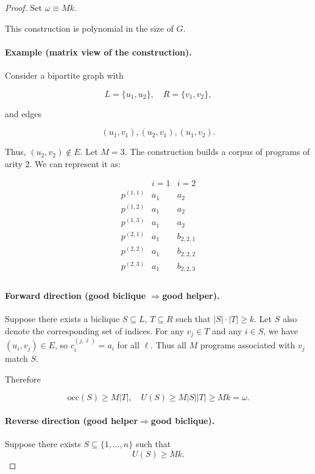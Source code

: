\begin{proof}
Set $\omega \equiv Mk$.

This construction is polynomial in the size of $G$.

\par\noindent
\paragraph{Example (matrix view of the construction).} Consider a bipartite graph with 

\[ 
L = \{u_1, u_2\}, \quad R = \{v_1, v_2\}, 
\] 

and edges 

\[ 
(u_1,v_1), (u_2,v_1), (u_1,v_2). 
\]

Thus, $(u_2, v_2) \notin E$. Let $M = 3$. The construction builds a corpus of programs of arity $2$. We can represent it as: 

\[ 
\begin{array}{c|cc} & i=1 & i=2 \\ \hline p^{(1,1)} & a_1 & a_2 \\ p^{(1,2)} & a_1 & a_2 \\ p^{(1,3)} & a_1 & a_2 \\ \hline p^{(2,1)} & a_1 & b_{2,2,1} \\ p^{(2,2)} & a_1 & b_{2,2,2} \\ p^{(2,3)} & a_1 & b_{2,2,3} \\ \end{array} 
\]

\par\noindent
\paragraph{Forward direction (good biclique $\Rightarrow$good helper).}
Suppose there exists a biclique $S \subseteq L$, $T \subseteq R$
such that $|S|\cdot|T| \ge k$.
Let $S$ also denote the corresponding set of indices. For any $v_j \in T$ and any $i \in S$, we have $(u_i,v_j)\in E$,
so $c_i^{(j,\ell)} = a_i$ for all $\ell$.
Thus all $M$ programs associated with $v_j$ match $S$.

Therefore

\[
\mathrm{occ}(S) \ge M|T|, \quad
U(S) \ge M|S||T| \ge Mk = \omega.
\]

\par\noindent
\paragraph{Reverse direction (good helper$\Rightarrow$good biclique).}
Suppose there exists $S \subseteq \{1,\dots,n\}$ such that
\[
U(S) \ge Mk.
\]


\end{proof}
